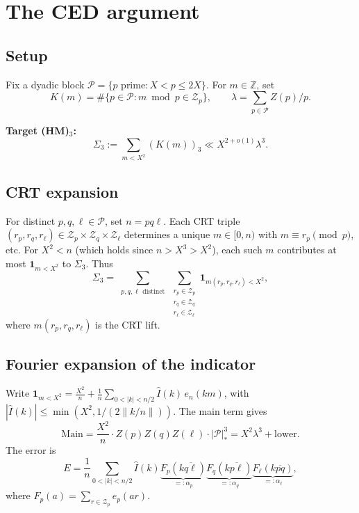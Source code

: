 
\section{The CED argument}

\subsection{Setup}
Fix a dyadic block $\mathcal{P} = \{p \text{ prime} : X < p \le 2X\}$.
For $m \in \mathbb{Z}$, set
\[
  K(m) = \#\{p \in \mathcal{P} : m \bmod p \in \mathcal{Z}_p\},
  \qquad \lambda = \sum_{p \in \mathcal{P}} Z(p)/p.
\]

\textbf{Target (HM)$_3$:}
\[
  \Sigma_3 := \sum_{m < X^2} (K(m))_3 \ll X^{2+o(1)} \lambda^3.
\]

\subsection{CRT expansion}
For distinct $p, q, \ell \in \mathcal{P}$, set $n = pq\ell$.
Each CRT triple $(r_p, r_q, r_\ell) \in \mathcal{Z}_p \times \mathcal{Z}_q \times \mathcal{Z}_\ell$
determines a unique $m \in [0, n)$ with $m \equiv r_p \pmod{p}$, etc.
For $X^2 < n$ (which holds since $n > X^3 > X^2$),
each such $m$ contributes at most $\mathbf{1}_{m < X^2}$ to $\Sigma_3$.
Thus
\[
  \Sigma_3 = \sum_{\substack{p,q,\ell \text{ distinct}}}
  \sum_{\substack{r_p \in \mathcal{Z}_p \\ r_q \in \mathcal{Z}_q \\ r_\ell \in \mathcal{Z}_\ell}}
  \mathbf{1}_{m(r_p,r_q,r_\ell) < X^2},
\]
where $m(r_p,r_q,r_\ell)$ is the CRT lift.

\subsection{Fourier expansion of the indicator}
Write $\mathbf{1}_{m < X^2} = \frac{X^2}{n} + \frac{1}{n}\sum_{0 < |k| < n/2}
\hat{I}(k) \, e_n(km)$, with $|\hat{I}(k)| \le \min(X^2, 1/(2\|k/n\|))$.
The main term gives
\[
  \text{Main} = \frac{X^2}{n} \cdot Z(p) Z(q) Z(\ell) \cdot |\mathcal{P}|^3_{*}
  = X^2 \lambda^3 + \text{lower}.
\]
The error is
\[
  E = \frac{1}{n} \sum_{0 < |k| < n/2} \hat{I}(k)
  \underbrace{F_p(k\overline{q\ell})}_{=: \alpha_p}
  \underbrace{F_q(k\overline{p\ell})}_{=: \alpha_q}
  \underbrace{F_\ell(k\overline{pq})}_{=: \alpha_\ell},
\]
where $F_p(a) = \sum_{r \in \mathcal{Z}_p} e_p(ar)$.

